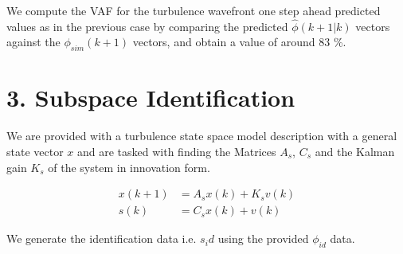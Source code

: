 \documentclass[12pt]{report}
\begin{document}
We compute the VAF for the turbulence wavefront one step ahead predicted values as in the previous case by comparing the predicted $\hat\phi(k+1|k)$ vectors against the $\phi_{sim}(k+1)$ vectors, and obtain a value of around 83 \%.

\newpage
\section*{3. Subspace Identification}

We are provided with a turbulence state space model description with a general state vector $x$ and are tasked with finding the Matrices $A_s$, $C_s$ and the Kalman gain $K_s$ of the system in innovation form.

\begin{equation}
\begin{aligned}
x(k+1) &= A_s x(k) + K_s v(k)\\
s(k) &= C_s x(k) + v(k)
\end{aligned}
\end{equation}

We generate the identification data i.e. $s_id$ using the provided $\phi_{id}$ data.
\end{document}
